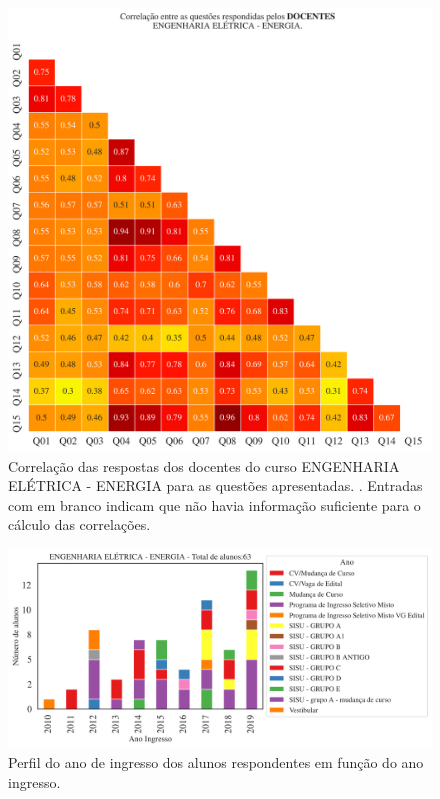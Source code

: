 \documentclass[a4paper,10pt]{article}
\begin{document}
\begin{figure}[h]
\centering
\includegraphics[width=0.999\linewidth]{matriz_corr__docentes_1109475.png}
\caption{\label{fig:corr_docentes}Correlação das respostas dos docentes do curso ENGENHARIA ELÉTRICA - ENERGIA para as questões apresentadas. . Entradas com em branco indicam que não havia informação suficiente para o cálculo das correlações.}
\end{figure}
\begin{figure}[h]
\centering
\includegraphics[width=0.85\linewidth]{ingresso_discentes_curso_ano_1109475.png}
\caption{\label{fig:ingresso_ano} Perfil do ano de ingresso dos alunos respondentes em função do ano ingresso.}
\end{figure}
\end{document}
